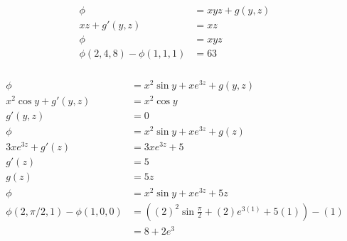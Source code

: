 \documentclass{article}
\begin{document}
\setcounter{subsubsection}{18}
\subsubsection{}

\begin{align*}
  \phi                          & = x y z + g(y, z) \\
  x z + g'(y, z)                & = x z             \\
  \phi                          & = x y z           \\
  \phi(2, 4, 8) - \phi(1, 1, 1) & = 63
\end{align*}

\setcounter{subsubsection}{20}
\subsubsection{}

\begin{align*}
  \phi                                & = x^2 \sin y + x e^{3 z} + g(y, z)                                      \\
  x^2 \cos y + g'(y, z)               & = x^2 \cos y                                                            \\
  g'(y, z)                            & = 0                                                                     \\
  \phi                                & = x^2 \sin y + x e^{3 z} + g(z)                                         \\
  3 x e^{3 z} + g'(z)                 & = 3 x e^{3 z} + 5                                                       \\
  g'(z)                               & = 5                                                                     \\
  g(z)                                & = 5 z                                                                   \\
  \phi                                & = x^2 \sin y + x e^{3 z} + 5 z                                          \\
  \phi(2, \pi / 2, 1) - \phi(1, 0, 0) & = \left( (2)^2 \sin \frac{\pi}{2} + (2) e^{3 (1)} + 5 (1) \right) - (1) \\
                                      & = 8 + 2 e^3
\end{align*}

\setcounter{subsubsection}{24}
\subsubsection{}
\end{document}
